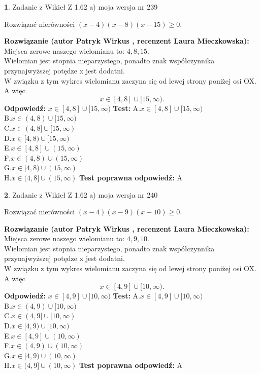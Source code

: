 \documentclass[12pt, a4paper]{article}
\theoremstyle{definition} %
\newtheorem{zad}{}
\newcommand{\zadStart}[1]{\begin{zad}#1\newline}
\newcommand{\zadStop}{\end{zad}}
\newcommand{\rozwStart}[2]{\noindent \textbf{Rozwiązanie (autor #1 , recenzent #2): }\newline}
\newcommand{\rozwStop}{\newline}
\newcommand{\odpStart}{\noindent \textbf{Odpowiedź:}\newline}
\newcommand{\odpStop}{\newline}
\newcommand{\testStart}{\noindent \textbf{Test:}\newline}
\newcommand{\testStop}{\newline}
\newcommand{\kluczStart}{\noindent \textbf{Test poprawna odpowiedź:}\newline}
\newcommand{\kluczStop}{\newline}
\begin{document}
\zadStart{Zadanie z Wikieł Z 1.62 a) moja wersja nr 239}

Rozwiązać nierówności $(x-4)(x-8)(x-15)\ge0$.
\zadStop
\rozwStart{Patryk Wirkus}{Laura Mieczkowska}
Miejsca zerowe naszego wielomianu to: $4, 8, 15$.\\
Wielomian jest stopnia nieparzystego, ponadto znak współczynnika przy\linebreak najwyższej potędze x jest dodatni.\\ W związku z tym wykres wielomianu zaczyna się od lewej strony poniżej osi OX. A więc $$x \in [4,8] \cup [15,\infty).$$
\rozwStop
\odpStart
$x \in [4,8] \cup [15,\infty)$
\odpStop
\testStart
A.$x \in [4,8] \cup [15,\infty)$\\
B.$x \in (4,8) \cup [15,\infty)$\\
C.$x \in (4,8] \cup [15,\infty)$\\
D.$x \in [4,8) \cup [15,\infty)$\\
E.$x \in [4,8] \cup (15,\infty)$\\
F.$x \in (4,8) \cup (15,\infty)$\\
G.$x \in [4,8) \cup (15,\infty)$\\
H.$x \in (4,8] \cup (15,\infty)$
\testStop
\kluczStart
A
\kluczStop



\zadStart{Zadanie z Wikieł Z 1.62 a) moja wersja nr 240}

Rozwiązać nierówności $(x-4)(x-9)(x-10)\ge0$.
\zadStop
\rozwStart{Patryk Wirkus}{Laura Mieczkowska}
Miejsca zerowe naszego wielomianu to: $4, 9, 10$.\\
Wielomian jest stopnia nieparzystego, ponadto znak współczynnika przy\linebreak najwyższej potędze x jest dodatni.\\ W związku z tym wykres wielomianu zaczyna się od lewej strony poniżej osi OX. A więc $$x \in [4,9] \cup [10,\infty).$$
\rozwStop
\odpStart
$x \in [4,9] \cup [10,\infty)$
\odpStop
\testStart
A.$x \in [4,9] \cup [10,\infty)$\\
B.$x \in (4,9) \cup [10,\infty)$\\
C.$x \in (4,9] \cup [10,\infty)$\\
D.$x \in [4,9) \cup [10,\infty)$\\
E.$x \in [4,9] \cup (10,\infty)$\\
F.$x \in (4,9) \cup (10,\infty)$\\
G.$x \in [4,9) \cup (10,\infty)$\\
H.$x \in (4,9] \cup (10,\infty)$
\testStop
\kluczStart
A
\kluczStop
\end{document}
